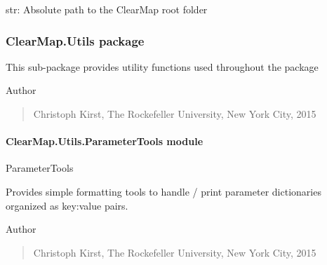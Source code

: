 \documentclass[letterpaper,10pt,english]{sphinxmanual}
\begin{document}

\begin{fulllineitems}
\label{api/ClearMap.Settings:ClearMap.Settings.ClearMapPath}
str: Absolute path to the ClearMap root folder

\end{fulllineitems}



\subsubsection{ClearMap.Utils package}
\label{api/ClearMap.Utils:module-ClearMap.Utils}\label{api/ClearMap.Utils::doc}\label{api/ClearMap.Utils:clearmap-utils-package}
This sub-package provides utility functions used throughout the package

Author
\begin{quote}

Christoph Kirst, The Rockefeller University, New York City, 2015
\end{quote}


\paragraph{ClearMap.Utils.ParameterTools module}
\label{api/ClearMap.Utils:module-ClearMap.Utils.ParameterTools}\label{api/ClearMap.Utils:clearmap-utils-parametertools-module}
ParameterTools

Provides simple formatting tools to handle / print parameter dictionaries
organized as key:value pairs.

Author
\begin{quote}

Christoph Kirst, The Rockefeller University, New York City, 2015
\end{quote}
\end{document}
